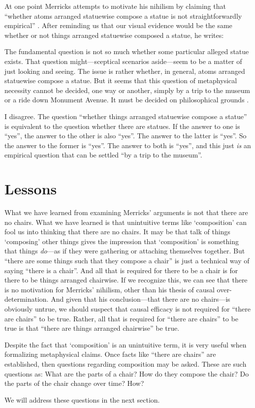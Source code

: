 \documentclass[11pt]{article}
\newenvironment{squote}{%
\begin{spacing}{1}
       	\begin{list}{}{%
\setlength{\labelwidth}{0pt}%
\rightmargin\leftmargin%
}
\item\relax
}{%
\end{list}%
\end{spacing}
}
\begin{document}
\begin{spacing}{1.25}
At one point Merricks attempts to motivate his nihilism by claiming
that ``whether atoms arranged statuewise compose a statue is not
straightforwardly empirical'' \citeyearpar[9]{merricks2001a}.  After
reminding us that our visual evidence would be the same whether or not
things arranged statuewise composed a statue, he writes:

\begin{squote}
The fundamental question is not so much whether some particular
alleged statue exists.  That question might---sceptical scenarios
aside---seem to be a matter of just looking and seeing.  The issue is
rather whether, in general, atoms arranged statuewise compose a
statue.  But it seems that this question of metaphysical necessity
cannot be decided, one way or another, simply by a trip to the museum
or a ride down Monument Avenue.  It must be decided on philosophical
grounds \citeyearpar[9]{merricks2001a}.
\end{squote}

I disagree.  The question ``whether things arranged statuewise compose
a statue'' is equivalent to the question whether there are statues.
If the answer to one is ``yes'', the answer to the other is also
``yes''.  The answer to the latter is ``yes''.  So the answer to the
former is ``yes''.  The answer to both is ``yes'', and this just {\em
  is} an empirical question that can be settled ``by a trip to the
museum''.

\section{Lessons}
What we have learned from examining Merricks' arguments is not that
there are no chairs.  What we have learned is that unintuitive terms
like `composition' can fool us into thinking that there are no chairs.
It may be that talk of things `composing' other things gives the
impression that `composition' is something that things {\em do}---as
if they were gathering or attaching themselves together.  But ``there
are some things such that they compose a chair'' is just a technical
way of saying ``there is a chair''.  And all that is required for
there to be a chair is for there to be things arranged chairwise.  If
we recognize this, we can see that there is no motivation for
Merricks' nihilism, other than his thesis of causal
over-determination.  And given that his conclusion---that there are no
chairs---is obviously untrue, we should suspect that causal efficacy
is not required for ``there are chairs'' to be true.  Rather, all that
is required for ``there are chairs'' to be true is that ``there are
things arranged chairwise'' be true.

Despite the fact that `composition' is an unintuitive term, it is very
useful when formalizing metaphysical claims.  Once facts like ``there
are chairs'' are established, then questions regarding composition may
be asked.  These are such questions as: What are the parts of a chair?
How do they compose the chair?  Do the parts of the chair change over
time?  How?

We will address these questions in the next section.
\ifstandalone
\end{spacing}


\fi
\end{document}

